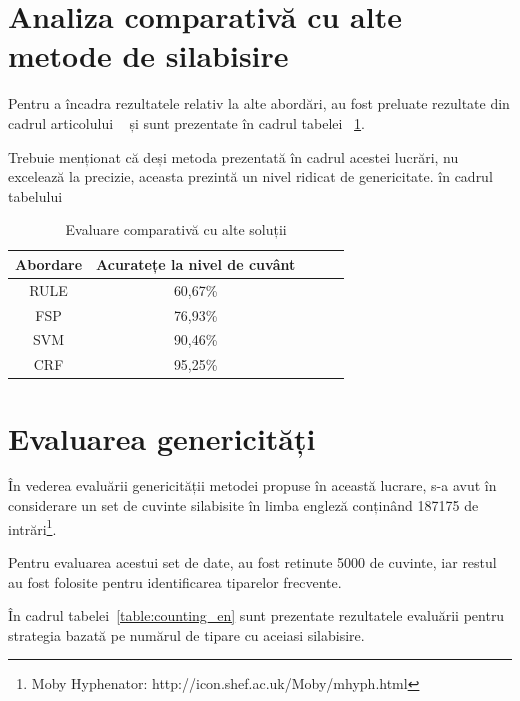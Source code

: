 \newpage
\section{Analiza comparativă cu alte metode de silabisire}

Pentru a încadra rezultatele relativ la alte abordări, au fost preluate rezultate din cadrul articolului ~\cite{bib:dinu2013romanian} și sunt prezentate în cadrul tabelei ~\ref{table:comparison}. 

Trebuie menționat că deși metoda prezentată în cadrul acestei lucrări, nu excelează la precizie, aceasta prezintă un nivel ridicat de genericitate. în cadrul tabelului 

\begin{table}[h!]
\centering
\begin{tabular}{|c|c|c|c|c|}
\hline
Abordare & Acuratețe la nivel de cuvânt\\  
\hline
\hline
RULE & 60,67\%\\ 
\hline
\color{cyan} FSP & \color{cyan}76,93\% \\ 
\hline
SVM & 90,46\%\\ 
\hline
CRF & 95,25\%\\ 
\hline\end{tabular}
\caption{Evaluare comparativă cu alte soluții} 
\label{table:comparison}
\end{table}

\section{Evaluarea genericități}

În vederea evaluării genericității metodei propuse în această lucrare, s-a avut în considerare un set de cuvinte silabisite în limba engleză conținând 187175 de intrări\footnote{Moby Hyphenator: http://icon.shef.ac.uk/Moby/mhyph.html}. 

Pentru evaluarea acestui set de date, au fost retinute 5000 de cuvinte, iar restul au fost folosite pentru identificarea tiparelor frecvente. 

În cadrul tabelei~\ref{table:counting_en} sunt prezentate rezultatele evaluării pentru strategia bazată pe numărul de tipare cu aceiasi silabisire.

